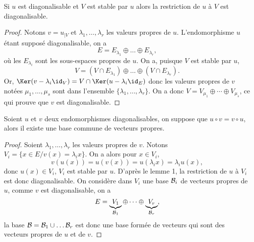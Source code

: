 \documentclass[class=report,crop=false]{standalone}
\begin{document}
\begin{lemme}
Si $u$ est diagonalisable et $V$ est stable par $u$ alors la restriction 
de $u$ à $V$ est diagonalisable.
\end{lemme}
 
\begin{proof}
Notons $v=u_{|V}$ et $\lambda_1,\dots,\lambda_r$ les valeurs propres de $u$. L'endomorphisme $u$ étant supposé diagonalisable, on a 
$$E=E_{\lambda_1}\oplus\dots\oplus E_{\lambda_r},$$
où les $E_{\lambda_i}$ sont les sous-espaces propres de $u$. On a, puisque $V$ est stable par $u$,
$$V=(V\cap E_{\lambda_1})\oplus\dots\oplus (V\cap E_{\lambda_r}).$$
Or, $\Ker(v-\lambda_i\id_V)=V\cap\Ker(u-\lambda_i\id_E)$ donc les valeurs propres de $v$ notées $\mu_1,\dots,\mu_s$ sont dans l'ensemble $\{\lambda_1,\dots,\lambda_r\}$. On a donc $V=V_{\mu_1}\oplus\cdots\oplus V_{\mu_s}$, ce qui prouve que $v$ est diagonalisable.

\end{proof}


\begin{lemme}
Soient $u$ et $v$ deux endomorphismes diagonalisables, on suppose que 
$u\circ v=v\circ u$, alors il existe une base commune de vecteurs propres. 
\end{lemme}


\begin{proof}
Soient $\lambda_1,\dots,\lambda_r$ les valeurs propres de $v$. Notons $V_i=\{x\in E/ v(x)=\lambda_i x\}$. On a alors pour $x\in V_i$,
$$v(u(x))=u(v(x))=u(\lambda_i x)=\lambda_i u(x),$$
donc $u(x)\in V_i$, $V_i$ est stable par $u$.
D'après le lemme 1, la restriction de $u$ à $V_i$ est donc diagonalisable. On considère dans $V_i$ une base ${\cal{B}}_i$ de vecteurs propres de $u$, comme $v$ est diagonalisable, on a 
$$E=\underbrace{V_1}_{{\cal{B}}_1}\oplus\cdots\oplus\underbrace{V_r}_{{\cal{B}}_r},$$
la base ${\cal{B}}={\cal{B}}_1\cup\dots{\cal{B}}_r$ est donc une base formée de vecteurs qui sont des vecteurs propres de $u$ et de $v$.

\end{proof}
\end{document}
